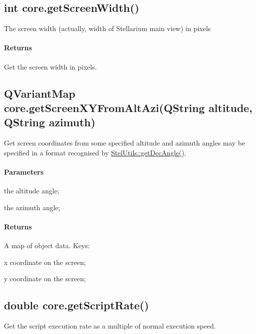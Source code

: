 \subsection{int core.getScreenWidth()}
\label{sec:ScriptingAPI:core:getScreenWidth}
The screen width (actually, width of Stellarium main view) in pixels

\paragraph{Returns}
Get the screen width in pixels.

\subsection{QVariantMap core.getScreenXYFromAltAzi(QString altitude, QString azimuth)}
\label{sec:ScriptingAPI:core:getScreenXYFromAltAzi}
Get screen coordinates from some specified altitude and azimuth angles may be specified in a format recognised by \href{http://www.stellarium.org/doc/head/namespaceStelUtils.html#acd88f8194549c7d46656952428720427}{StelUtils::getDecAngle()}.

\paragraph{Parameters}
\begin{description}[align=right,labelwidth=3cm,leftmargin=3.2cm]
\item[\parameter{altitude}] the altitude angle;
\item[\parameter{azimuth}] the azimuth angle;
\end{description}

\paragraph{Returns}
A map of object data. Keys:
\begin{description}[align=right,labelwidth=3cm,leftmargin=3.2cm]
\item[\keymap{x}] x coordinate on the screen;
\item[\keymap{y}] y coordinate on the screen;
\end{description}

\subsection{double core.getScriptRate()}
\label{sec:ScriptingAPI:core:getScriptRate}
Get the script execution rate as a multiple of normal execution speed.

